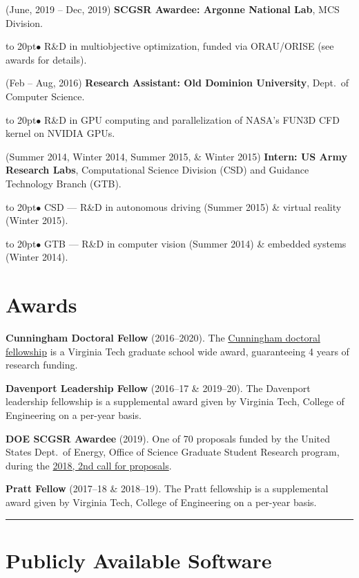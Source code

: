 \documentclass[12pt]{article}
\def\bullitem{\par\hangindent=15pt \hangafter=1
\noindent\hbox to 20pt{\hfil$\bullet$\hfil}\ignorespaces}
\def\hrulefull{\noindent\rule{\textwidth}{0.2pt}}
\begin{document}
\medskip

\hangindent=0.3in
(June, 2019 -- Dec, 2019)
\textbf{SCGSR Awardee: Argonne National Lab}, MCS Division.
\bullitem
R\&D in multiobjective optimization, funded via ORAU/ORISE
(see awards for details).

\medskip

\hangindent=0.3in
(Feb -- Aug, 2016)
\textbf{Research Assistant: Old Dominion University},
Dept.\ of Computer Science.
\bullitem
R\&D in GPU computing and parallelization of NASA's FUN3D CFD kernel on
NVIDIA GPUs.

\medskip

\hangindent=0.3in
(Summer 2014, Winter 2014, Summer 2015, \& Winter 2015)
\textbf{Intern: US Army Research Labs}, 
Computational Science Division (CSD) and Guidance Technology Branch (GTB).
\bullitem
CSD --- R\&D in autonomous driving (Summer 2015) \&
virtual reality (Winter 2015).
\bullitem
GTB --- R\&D in computer vision (Summer 2014) \& embedded systems (Winter 2014).

\medskip

\newpage

\section*{Awards}

\textbf{Cunningham Doctoral Fellow} (2016--2020).
The 
\href{https://graduateschool.vt.edu/funding/types-of-funding/funding-sponsored-by-the-graduate-school/cunningham-doctoral-assistantships.html}
{Cunningham doctoral fellowship} is a Virginia Tech graduate school wide
award, guaranteeing 4 years of research funding.

\textbf{Davenport Leadership Fellow} (2016--17 \& 2019--20).
The Davenport leadership fellowship is a supplemental award given by
Virginia Tech, College of Engineering on a per-year basis.

\textbf{DOE SCGSR Awardee} (2019).
One of 70 proposals funded by the United States Dept.\ of Energy,
Office of Science Graduate Student Research program, during the
\href{https://www.energy.gov/articles/doe-s-science-graduate-student-research-program-selects-70-students-pursue-research-doe}{2018, 2nd call for proposals}.

\textbf{Pratt Fellow} (2017--18 \& 2018--19).
The Pratt fellowship is a supplemental award given by
Virginia Tech, College of Engineering on a per-year basis.

\medskip
\hrulefull
\section*{Publicly Available Software}
\end{document}
